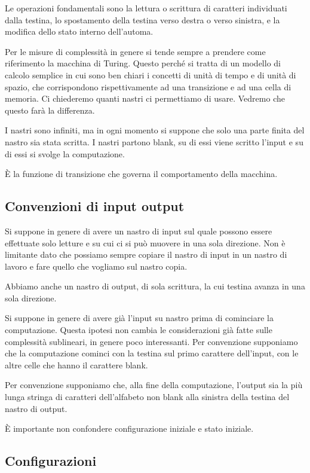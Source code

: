 Le operazioni fondamentali sono la lettura o scrittura di caratteri individuati dalla testina, lo
spostamento della testina verso destra o verso sinistra, e la modifica dello stato interno
dell'automa.

Per le misure di complessità in genere si tende sempre a prendere come riferimento la macchina di
Turing. Questo perché si tratta di un modello di calcolo semplice in cui sono ben chiari i concetti
di unità di tempo e di unità di spazio, che corrispondono rispettivamente ad una transizione e ad
una cella di memoria.  Ci chiederemo quanti nastri ci permettiamo di usare. Vedremo che questo farà
la differenza.

I nastri sono infiniti, ma in ogni momento si suppone che solo una parte finita del nastro sia stata
scritta. I nastri partono blank, su di essi viene scritto l'input e su di essi si svolge la
computazione.

È la funzione di transizione che governa il comportamento della macchina.

\subsection{Convenzioni di input output}


Si suppone in genere di avere un nastro di input sul quale possono essere effettuate solo letture e
su cui ci si può muovere in una sola direzione. Non è limitante dato che possiamo sempre copiare il
nastro di input in un nastro di lavoro e fare quello che vogliamo sul nastro copia.

Abbiamo anche un nastro di output, di sola scrittura, la cui testina avanza in una sola direzione.

Si suppone in genere di avere già l'input su nastro prima di cominciare la computazione.  Questa
ipotesi non cambia le considerazioni già fatte sulle complessità sublineari, in genere poco
interessanti. Per convenzione supponiamo che la computazione cominci con la testina sul primo
carattere dell'input, con le altre celle che hanno il carattere blank.

Per convenzione supponiamo che, alla fine della computazione, l'output sia la più lunga stringa di
caratteri dell'alfabeto non blank alla sinistra della testina del nastro di output.

È importante non confondere configurazione iniziale e stato iniziale.

\subsection{Configurazioni}

